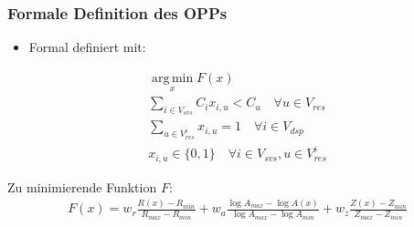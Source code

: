 \documentclass{beamer}
\begin{document}
\begin{frame}
\frametitle{Formale Definition des OPPs}
\begin{itemize}
    \item Formal definiert mit:
\end{itemize}
\begin{center}
\[
\begin{gathered}
    \operatorname*{arg\,min}_x F(x) \\
    \sum_{i \in V_{svs}} C_i x_{i,u} < C_u \quad \forall u \in V_{res}  \\ %
    \sum_{u \in V_{res}^i} x_{i,u} = 1 \quad \forall i \in V_{dsp} \\ %
    x_{i,u} \in \{0,1\} \quad \forall i \in V_{svs}, u \in V_{res}^i
\end{gathered}
\]
\item Zu minimierende Funktion $F$:
\[
\begin{gathered}
    F(x) = w_r \frac{R(x) - R_{min}}{R_{max} - R_{min}} 
    + w_a \frac{\log A_{max} - \log A(x)}{\log A_{max} - \log A_{min}} 
    + w_z \frac{Z(x) - Z_{min}}{Z_{max} - Z_{min}} 
\end{gathered} \label{to-minimize-function}
\]
\end{center}
\end{frame}

\end{document}
